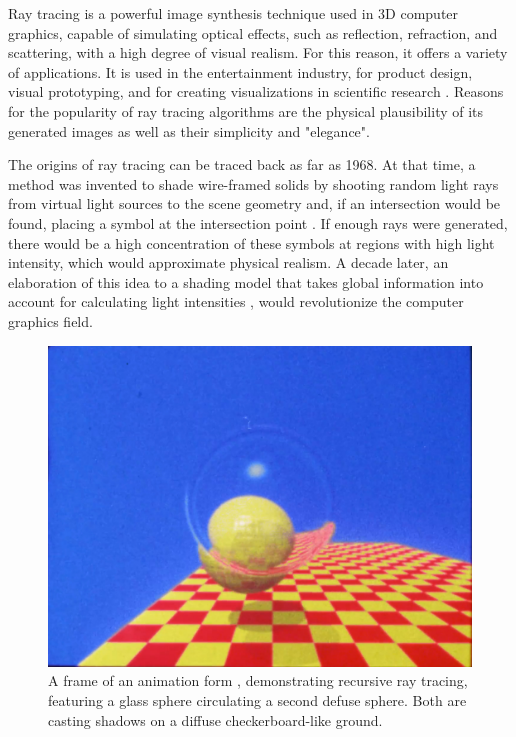 \label{chap:intro}

Ray tracing is a powerful image synthesis technique used in 3D computer graphics, capable of simulating optical effects, such as reflection, refraction, and scattering, with a high degree of visual realism. For this reason, it offers a variety of applications. It is used in the entertainment industry, for product design, visual prototyping, and for creating visualizations in scientific research \cite [91-128]{peddie2019ray}. Reasons for the popularity of ray tracing algorithms are the physical plausibility of its generated images as well as their simplicity and "elegance". 

The origins of ray tracing can be traced back as far as 1968. At that time, a method was invented to shade wire-framed solids by shooting random light rays from virtual light sources to the scene geometry and, if an intersection would be found, placing a symbol at the intersection point \cite{appel1968some}. If enough rays were generated, there would be a high concentration of these symbols at regions with high light intensity, which would approximate physical realism. A decade later, an elaboration of this idea to a shading model that takes global information into account for calculating light intensities  \cite{whitted1979improved}, would revolutionize the computer graphics field.

\begin{figure} \label{fig:whitted_result}
	\centering
	\includegraphics[width=.7\linewidth]{img/0 introduction/whitted_}
	\caption{A frame of an animation \cite{raytracingvideo} form \cite {whitted1979improved}, demonstrating recursive ray tracing, featuring a glass sphere circulating a second defuse sphere. Both are casting shadows on a diffuse checkerboard-like ground.}
	\label{fig:g}
\end{figure}

